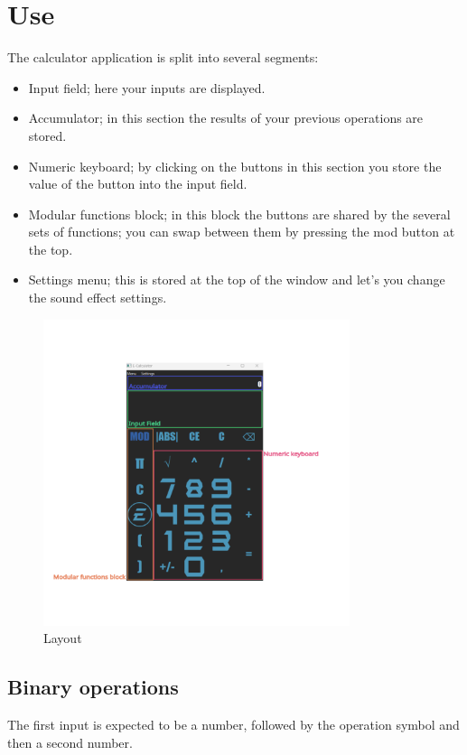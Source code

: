 \documentclass{article}
\begin{document}
\section{Use}
The calculator application is split into several segments:
\begin{itemize}
	 \item{Input field; here your inputs are displayed.}
	 \item{Accumulator; in this section the results of your previous operations are stored.}
	 \item{Numeric keyboard; by clicking on the buttons in this section you store the value of the button into the input field.}
	 \item{Modular functions block; in this block the buttons are shared by the several sets of functions; you can swap between them by pressing the mod button at the top.}
	 \item{Settings menu; this is stored at the top of the window and let's you change the sound effect settings.}
 \end{itemize}
 \begin{figure}[H]
    \centering
    \includegraphics[width=0.8\textwidth]{kalkulacka_comment.png}
    \caption{Layout}
    \label{fig:enter-label}
\end{figure}

\subsection{Binary operations}
	The first input is expected to be a number, followed by the operation symbol and then a second number.
 
\end{document}
